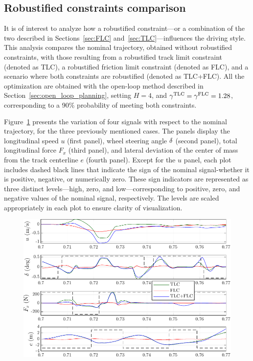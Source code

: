 \subsection{Robustified constraints comparison}
It is of interest to analyze how a robustified constraint---or a combination of the two described in Sections~\ref{sec:FLC} and~\ref{sec:TLC}---influences the driving style. This analysis compares the nominal trajectory, obtained without robustified constraints, with those resulting from a robustified track limit constraint (denoted as TLC), a robustified friction limit constraint (denoted as FLC), and a scenario where both constraints are robustified (denoted as TLC+FLC). All the optimization are obtained with the open-loop method described in Section~\ref{sec:open_loop_planning}, setting $H=4$, and $\gamma^\textrm{TLC}=\gamma^\textrm{FLC}=1.28$, corresponding to a 90\% probability of meeting both constraints. 

Figure~\ref{fig:ol_telemetries} presents the variation of four signals with respect to the nominal trajectory, for the three previously mentioned cases. The panels display the longitudinal speed $u$ (first panel), wheel steering angle $\delta$ (second panel), total longitudinal force $F_x$ (third panel), and lateral deviation of the center of mass from the track centerline $e$ (fourth panel). Except for the $u$ panel, each plot includes dashed black lines that indicate the sign of the nominal signal-whether it is positive, negative, or numerically zero. These sign indicators are represented as three distinct levels---high, zero, and low---corresponding to positive, zero, and negative values of the nominal signal, respectively. The levels are scaled appropriately in each plot to ensure clarity of visualization.

\begin{figure}
	\centering
	\includegraphics{Fig/ol_telemetries.pdf}
	\caption{}
	\label{fig:ol_telemetries}
\end{figure}

